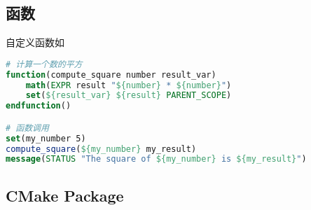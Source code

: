 \subsection{函数}
自定义函数如
\begin{lstlisting}[language=cmake]
# 计算一个数的平方
function(compute_square number result_var)
    math(EXPR result "${number} * ${number}")
    set(${result_var} ${result} PARENT_SCOPE)
endfunction()

# 函数调用
set(my_number 5)
compute_square(${my_number} my_result)
message(STATUS "The square of ${my_number} is ${my_result}")
\end{lstlisting}

\subsection{CMake Package}
